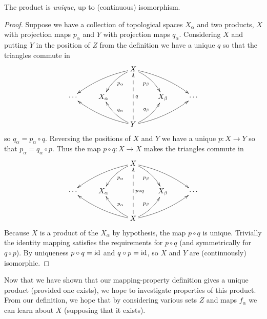       \begin{claim}
        \label{claim:uniqprod}
        The product is \emph{unique}, up to (continuous) isomorphism.
        \begin{proof}
          Suppose we have a collection of topological spaces $X_\alpha$ and two products, $X$ with projection maps $p_\alpha$ and $Y$ with projection maps $q_\alpha$.
          Considering $X$ and putting $Y$ in the position of $Z$ from the definition we have a unique $q$ so that the triangles commute in
          \begin{displaymath}
            \xymatrix{
              && X \ar@/_/[dll] \ar@/_/[dl]^{p_\alpha} \ar@/^/[dr]_{p_\beta} \ar@/^/[drr] \\
              \cdots & X_\alpha && X_\beta & \cdots\\
              && Y \ar@/^/[ull] \ar@/^/[ul]_{q_\alpha} \ar@{-->}[uu]_q \ar@/_/[ur]^{q_\beta} \ar@/_/[urr]
             }
          \end{displaymath}
          so $q_\alpha=p_\alpha\circ q$.
          Reversing the positions of $X$ and $Y$ we have a unique $p:X\rightarrow Y$ so that $p_\alpha=q_\alpha\circ p$.
          Thus the map $p\circ q:X\rightarrow X$ makes the triangles commute in
          \begin{displaymath}
            \xymatrix{
              && X \ar@/_/[dll] \ar@/_/[dl]^{p_\alpha} \ar@/^/[dr]_{p_\beta} \ar@/^/[drr] \\
              \cdots & X_\alpha && X_\beta & \cdots\\
              && X \ar@/^/[ull] \ar@/^/[ul]_{p_\alpha} \ar@{-->}[uu]_{p\circ q} \ar@/_/[ur]^{p_\beta} \ar@/_/[urr]
             }
          \end{displaymath}
          Because $X$ is a product of the $X_\alpha$ by hypothesis, the map $p\circ q$ is unique.
          Trivially the identity mapping satisfies the requirements for $p\circ q$ (and symmetrically for $q\circ p$).
          By uniqueness $p\circ q=\operatorname{id}$ and $q\circ p=\operatorname{id}$,  so $X$ and $Y$ are (continuously) isomorphic.
        \end{proof}
      \end{claim}

      Now that we have shown that our mapping-property definition gives a unique product (provided one exists), we hope to investigate properties of this product.
      From our definition, we hope that by considering various sets $Z$ and maps $f_\alpha$ we can learn about $X$ (supposing that it exists).

